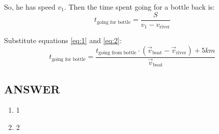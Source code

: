 So, he has speed $v_1$. Then the time spent going for a bottle back is:
$$t_{\text{going for bottle}} = \frac{S}{v_1 - v_{\text{river}}}$$

Substitute equations \eqref{eq:1} and \eqref{eq:2}:
$$t_{\text{going for bottle}} = \frac{t_{\text{going from bottle}} \cdot (\Vec{v}_{\text{boat}} - \Vec{v}_{\text{river}}) + 5km}{\Vec{v}_{\text{boat}}}$$


\vfill
\subsection*{ANSWER}
\begin{enumerate}
    \item 1
    \item 2
\end{enumerate}

